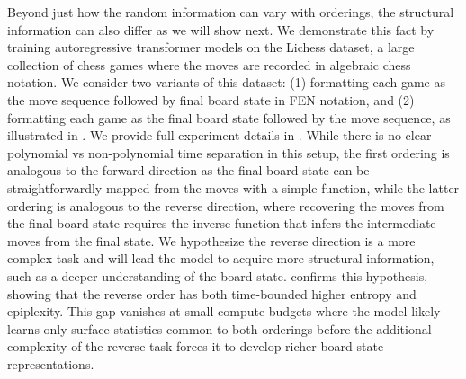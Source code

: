 \documentclass[twoside]{article}
\begin{document}
%
%
%
%
%
Beyond just how the random information can vary with orderings, the structural information can also differ as we will show next.
%
We demonstrate this fact by training autoregressive transformer models on the Lichess dataset, a large collection of chess games where the moves are recorded in algebraic chess notation. We consider two variants of this dataset: (1) formatting each game as the move sequence followed by final board state in FEN notation, and (2) formatting each game as the final board state followed by the move sequence, as illustrated in . We provide full experiment details in . While there is no clear polynomial vs non-polynomial time separation in this setup, the first ordering is analogous to the forward direction as the final board state can be straightforwardly mapped from the moves with a simple function, while the latter ordering is analogous to the reverse direction, where recovering the moves from the final board state requires the inverse function that infers the intermediate moves from the final state. We hypothesize the reverse direction is a more complex task and will lead the model to acquire more structural information, such as a deeper understanding of the board state.  confirms this hypothesis, showing that the reverse order has both time-bounded higher entropy and epiplexity. This gap vanishes at small compute budgets where the model likely learns only surface statistics common to both orderings before the additional complexity of the reverse task forces it to develop richer board-state representations.

%

%
%
%
%
%
%
%
%
%


%






%

%
%
%
%
%

%
%
%
%
%
%
%
%
%
%
%
%
%
%
%
%
    

%
%
%
%
%
%
%


%
\end{document}
